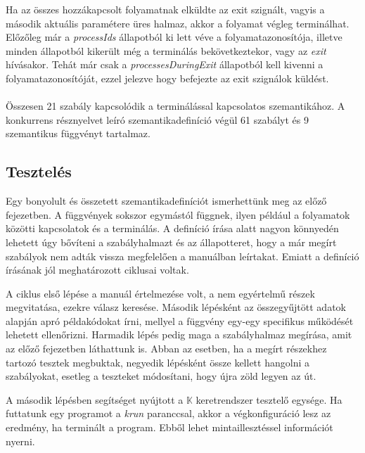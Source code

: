 

Ha az összes hozzákapcsolt folyamatnak elküldte az exit szignált, vagyis a második aktuális paramétere üres halmaz, akkor a folyamat végleg terminálhat. Előzőleg már a \textit{processIds} állapotból ki lett véve a folyamatazonosítója, illetve minden állapotból kikerült még a terminálás bekövetkeztekor, vagy az \textit{exit} hívásakor. Tehát már csak a \textit{processesDuringExit} állapotból kell kivenni a folyamatazonosítóját, ezzel jelezve hogy befejezte az exit szignálok küldést.

\paragraph{}
Összesen 21 szabály kapcsolódik a terminálással kapcsolatos szemantikához. A konkurrens résznyelvet leíró szemantikadefiníció végül 61 szabályt és 9 szemantikus függvényt tartalmaz.

\subsection{Tesztelés}

Egy bonyolult és összetett szemantikadefiníciót ismerhettünk meg az előző fejezetben. A függvények sokszor egymástól függnek, ilyen például a folyamatok közötti kapcsolatok és a terminálás. A definíció írása alatt nagyon könnyedén lehetett úgy bővíteni a szabályhalmazt és az állapotteret, hogy a már megírt szabályok nem adták vissza megfelelően a manuálban leírtakat. Emiatt a definíció írásának jól meghatározott ciklusai voltak.

A ciklus első lépése a manuál értelmezése volt, a nem egyértelmű részek megvitatása, ezekre válasz keresése. Második lépésként az összegyűjtött adatok alapján apró példakódokat írni, mellyel a függvény egy-egy specifikus működését lehetett ellenőrizni. Harmadik lépés pedig maga a szabályhalmaz megírása, amit az előző fejezetben láthattunk is. Abban az esetben, ha a megírt részekhez tartozó tesztek megbuktak, negyedik lépésként össze kellett hangolni a szabályokat, esetleg a teszteket módosítani, hogy újra zöld legyen az út.

A második lépésben segítséget nyújtott a $\mathbb{K}$ keretrendszer tesztelő egysége. Ha futtatunk egy programot a \textit{krun} paranccsal, akkor a végkonfiguráció lesz az eredmény, ha terminált a program. Ebből lehet mintaillesztéssel információt nyerni.



